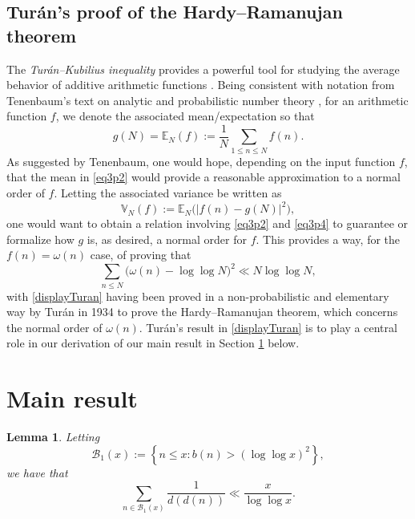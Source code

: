 \documentclass[12pt]{article}
\newtheorem{lemma}{Lemma}%
\begin{document}
\subsection{Tur\'an's proof of the Hardy--Ramanujan theorem}\label{secTuran}
 The \emph{Tur\'an--Kubilius inequality} provides a powerful tool for studying the average behavior of additive arithmetic functions 
 \cite[\S3.2]{Tenenbaum2015}. Being consistent with notation from Tenenbaum's text on analytic and probabilistic number theory 
 \cite[\S3.2]{Tenenbaum2015}, for an arithmetic function $f$, we denote the associated mean/expectation so that 
\begin{equation}\label{eq3p2}
 g(N) = \mathbb{E}_{N}(f) := \frac{1}{N} \sum_{1 \leq n \leq N} f(n). 
\end{equation} 
 As suggested by Tenenbaum, one would hope, depending on the input function $f$, that the mean in \eqref{eq3p2} would provide a 
 reasonable approximation to a normal order of $f$. Letting the associated variance be written as 
\begin{equation}\label{eq3p4}
 \mathbb{V}_{N}(f) := \mathbb{E}_{N}\big( |f(n) - g(N)|^2 \big), 
\end{equation} 
 one would want to obtain a relation involving \eqref{eq3p2} and \eqref{eq3p4} to guarantee or formalize how $g$ is, as desired, a 
 normal order for $f$. 
 This provides a way, for the $f(n) = \omega(n)$ case, 
 of proving that 
\begin{equation}\label{displayTuran}
 \sum_{n \leq N} \big( \omega(n) - \log \log N \big)^{2} \ll N \log \log N, 
\end{equation}
 with \eqref{displayTuran} having been proved in a non-probabilistic and elementary way by Tur\'an in 1934 \cite{Turan1934} to prove the 
 Hardy--Ramanujan theorem, which concerns the normal order of $\omega(n)$. Tur\'an's result in \eqref{displayTuran} is to play a 
 central role in our derivation of our main result in Section \ref{secmain} below. 
 
\section{Main result}\label{secmain}

\begin{lemma}\label{lemmaB1}
 Letting $$ \mathcal{B}_{1}(x) := \left\{ n \leq x : b(n) > (\log \log x)^{2} \right\}, $$ we have that $$ \sum_{n \in \mathcal{B}_{1}(x)} 
 \frac{1}{d(d(n))} \ll \frac{x}{\log \log x}. $$
\end{lemma}
\end{document}
